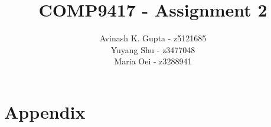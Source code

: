\documentclass[11pt, oneside]{article}   	%
\title{COMP9417 - Assignment 2}
\author{Avinash K. Gupta - z5121685\\ Yuyang Shu - z3477048\\ Maria Oei - z3288941}
\begin{document}
\maketitle


\newpage
\tableofcontents
\newpage
\justify







%
\section{Appendix}


\newpage


\newpage

\medskip


\end{document}
